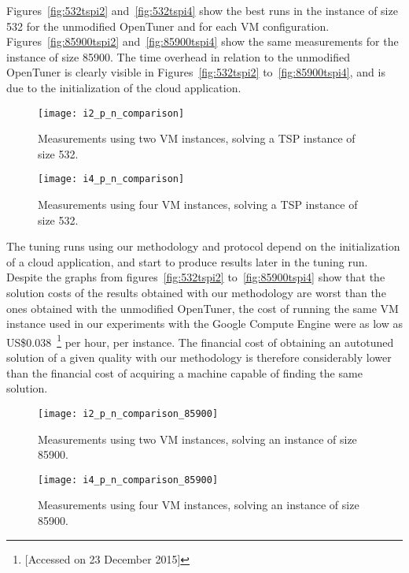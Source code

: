 Figures~\ref{fig:532tspi2} and~\ref{fig:532tspi4} show the best runs in the
instance of size 532 for the unmodified OpenTuner and for each VM
configuration.  Figures~\ref{fig:85900tspi2} and~\ref{fig:85900tspi4} show the
same measurements for the instance of size 85900.  The time overhead in
relation to the unmodified OpenTuner is clearly visible in
Figures~\ref{fig:532tspi2} to~\ref{fig:85900tspi4}, and is due to the
initialization of the cloud application.

\begin{figure}[htpb]
    \centering
    \begin{minipage}{.48\textwidth}
        \centering
        \texttt{[image: i2\_p\_n\_comparison]}
        \caption{Measurements using two VM instances, solving
                 a TSP instance of size 532.}
        \label{fig:532tspi2}
    \end{minipage}%
    \hfill
    \begin{minipage}{.48\textwidth}
        \centering
        \texttt{[image: i4\_p\_n\_comparison]}
        \caption{Measurements using four VM instances,
                 solving a TSP instance of size 532.}
        \label{fig:532tspi4}
    \end{minipage}%
    \label{fig:532tsp}
\end{figure}

The tuning runs using our methodology and protocol depend on the initialization
of a cloud application, and start to produce results later in the tuning run.
Despite the graphs from figures~\ref{fig:532tspi2} to~\ref{fig:85900tspi4} show
that the solution costs of the results obtained with our methodology are worst
than the ones obtained with the unmodified OpenTuner, the cost of running the
same VM instance used in our experiments with the Google Compute Engine were as
low as
US\$0.038~\footnote{
[Accessed on 23 December 2015]} per hour, per instance. The financial cost of
obtaining an autotuned solution of a given quality with our methodology is
therefore considerably lower than the financial cost of acquiring a machine
capable of finding the same solution.

\begin{figure}[htpb]
    \centering
    \begin{minipage}{.48\textwidth}
        \centering
        \texttt{[image: i2\_p\_n\_comparison\_85900]}
        \caption{Measurements using two VM instances,
                 solving an instance of size 85900.}
        \label{fig:85900tspi2}
    \end{minipage}%
    \hfill
    \begin{minipage}{.48\textwidth}
        \centering
        \texttt{[image: i4\_p\_n\_comparison\_85900]}
        \caption{Measurements using four VM instances,
                 solving an instance of size 85900.}
        \label{fig:85900tspi4}
    \end{minipage}%
    \label{fig:85900tsp}
\end{figure}

